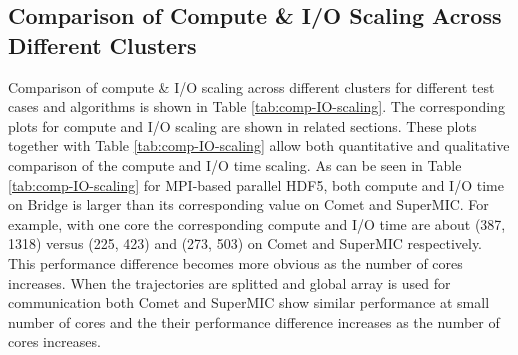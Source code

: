 \subsection{Comparison of Compute \& I/O Scaling Across Different Clusters}
Comparison of compute \& I/O scaling across different clusters for different test cases and algorithms is shown in Table \ref{tab:comp-IO-scaling}. 
The corresponding plots for compute and I/O scaling are shown in related sections. 
These plots together with Table \ref{tab:comp-IO-scaling} allow both quantitative and qualitative comparison of the compute and I/O time scaling.
As can be seen in Table \ref{tab:comp-IO-scaling} for MPI-based parallel HDF5, both compute and I/O time on Bridge is larger than its corresponding value on Comet and SuperMIC.
For example, with one core the corresponding compute and I/O time are about (387, 1318) versus (225, 423) and (273, 503) on Comet and SuperMIC respectively.
This performance difference becomes more obvious as the number of cores increases.
When the trajectories are splitted and global array is used for communication both Comet and SuperMIC show similar performance at small number of cores and the their performance difference increases as the number of cores increases. 

